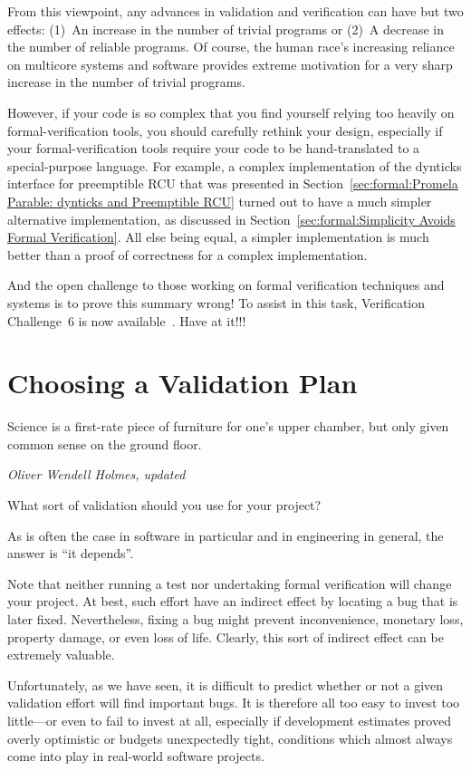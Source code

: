 From this viewpoint, any advances in validation and verification can
have but two effects: (1)~An increase in the number of trivial programs or
(2)~A decrease in the number of reliable programs.
Of course, the human race's increasing reliance on multicore systems and
software provides extreme motivation for a very sharp increase in the
number of trivial programs.

However, if your code is so complex that you find yourself
relying too heavily on formal-verification
tools, you should carefully rethink your design, especially if your
formal-verification tools require your code to be hand-translated
to a special-purpose language.
For example, a complex implementation of the dynticks interface for
preemptible RCU that was presented in
Section~\ref{sec:formal:Promela Parable: dynticks and Preemptible RCU}
turned out to
have a much simpler alternative implementation, as discussed in
Section~\ref{sec:formal:Simplicity Avoids Formal Verification}.
All else being equal, a simpler implementation is much better than
a proof of correctness for a complex implementation.

And the open challenge to those working on formal verification techniques
and systems is to prove this summary wrong!
To assist in this task, Verification Challenge~6 is now
available~\cite{PaulEMcKenney2017VerificationChallenge6}.
Have at it!!!

\section{Choosing a Validation Plan}
\label{sec:formal:Choosing a Validation Plan}
%
\epigraph{Science is a first-rate piece of furniture for one's upper
	  chamber, but only given common sense on the ground floor.}
	 {\emph{Oliver Wendell Holmes, updated}}

What sort of validation should you use for your project?

As is often the case in software in particular and in engineering
in general, the answer is ``it depends''.

Note that neither running a test nor undertaking formal verification
will change your project.
At best, such effort have an indirect effect by locating a bug that
is later fixed.
Nevertheless, fixing a bug might prevent inconvenience, monetary loss,
property damage, or even loss of life.
Clearly, this sort of indirect effect can be extremely valuable.

Unfortunately, as we have seen, it is difficult to predict whether or
not a given validation effort will find important bugs.
It is therefore all too easy to invest too little---or even to fail
to invest at all, especially if development estimates proved overly
optimistic or budgets unexpectedly tight, conditions which almost
always come into play in real-world software projects.

